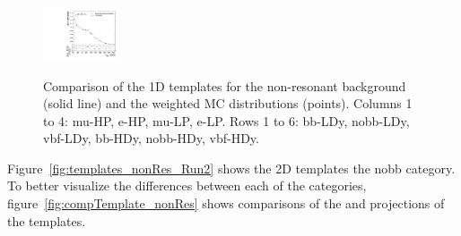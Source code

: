 \begin{figure}[htbp]
  \includegraphics[width=0.2\textwidth]{fig/analysisAppendix/templateVsReco_nonRes_r0_MJ_e_LP_vbf_HDy.pdf}\\
  \caption{
    Comparison of the 1D \MJ templates for the non-resonant background (solid line) and the weighted MC distributions (points).
    Columns 1 to 4: mu-HP, e-HP, mu-LP, e-LP.
    Rows 1 to 6: bb-LDy, nobb-LDy, vbf-LDy, bb-HDy, nobb-HDy, vbf-HDy.
  }
  \label{fig:1dtemplateVsReco_nonRes_MJ_Run2}
\end{figure}

Figure~\ref{fig:templates_nonRes_Run2} shows the 2D templates the nobb category.
To better visualize the differences between each of the categories, figure~\ref{fig:compTemplate_nonRes} shows comparisons of the \MVV and \MJ projections of the templates.

